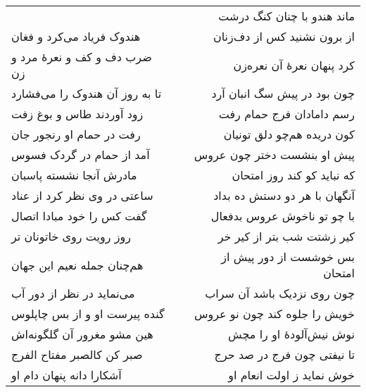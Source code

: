 \begin{center}
\begin{longtable}{l p{0.5cm} r}
&&
ماند هندو با چنان کنگ درشت
\\
هندوک فریاد می‌کرد و فغان
&&
از برون نشنید کس از دف‌زنان
\\
ضرب دف و کف و نعرهٔ مرد و زن
&&
کرد پنهان نعرهٔ آن نعره‌زن
\\
تا به روز آن هندوک را می‌فشارد
&&
چون بود در پیش سگ انبان آرد
\\
زود آوردند طاس و بوغ زفت
&&
رسم دامادان فرج حمام رفت
\\
رفت در حمام او رنجور جان
&&
کون دریده هم‌چو دلق تونیان
\\
آمد از حمام در گردک فسوس
&&
پیش او بنشست دختر چون عروس
\\
مادرش آنجا نشسته پاسبان
&&
که نباید کو کند روز امتحان
\\
ساعتی در وی نظر کرد از عناد
&&
آنگهان با هر دو دستش ده بداد
\\
گفت کس را خود مبادا اتصال
&&
با چو تو ناخوش عروس بدفعال
\\
روز رویت روی خاتونان تر
&&
کیر زشتت شب بتر از کیر خر
\\
هم‌چنان جمله نعیم این جهان
&&
بس خوشست از دور پیش از امتحان
\\
می‌نماید در نظر از دور آب
&&
چون روی نزدیک باشد آن سراب
\\
گنده پیرست او و از بس چاپلوس
&&
خویش را جلوه کند چون نو عروس
\\
هین مشو مغرور آن گلگونه‌اش
&&
نوش نیش‌آلودهٔ او را مچش
\\
صبر کن کالصبر مفتاح الفرج
&&
تا نیفتی چون فرج در صد حرج
\\
آشکارا دانه پنهان دام او
&&
خوش نماید ز اولت انعام او
\\
\end{longtable}
\end{center}
